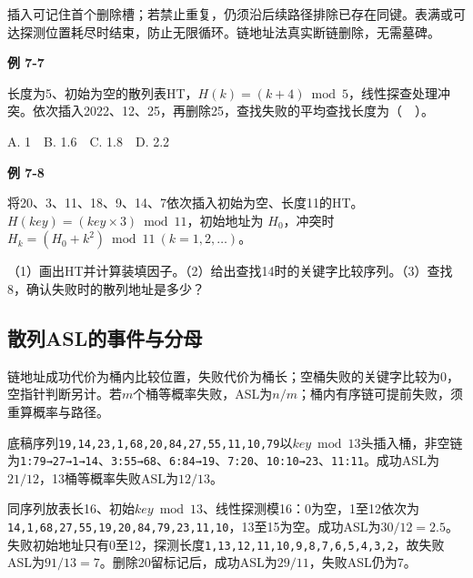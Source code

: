 插入可记住首个删除槽；若禁止重复，仍须沿后续路径排除已存在同键。表满或可达探测位置耗尽时结束，防止无限循环。链地址法真实断链删除，无需墓碑。

\par\medskip{}\noindent\hypertarget{DS07-E07}{}\label{DS07-E07}\textbf{例 7-7}\par\nobreak\smallskip

长度为5、初始为空的散列表HT，\(H(k)=(k+4)\bmod5\)，线性探查处理冲突。依次插入2022、12、25，再删除25，查找失败的平均查找长度为（　）。

A. 1　B. 1.6　C. 1.8　D. 2.2

\par\medskip{}\noindent\hypertarget{DS07-E08}{}\label{DS07-E08}\textbf{例 7-8}\par\nobreak\smallskip

将20、3、11、18、9、14、7依次插入初始为空、长度11的HT。\(H(key)=(key\times3)\bmod11\)，初始地址为 \(H_0\)，冲突时 \(H_k=(H_0+k^2)\bmod11\ (k=1,2,\ldots)\)。

（1）画出HT并计算装填因子。（2）给出查找14时的关键字比较序列。（3）查找8，确认失败时的散列地址是多少？

\subsection{散列ASL的事件与分母}\label{DS07-hash-asl}

链地址成功代价为桶内比较位置，失败代价为桶长；空桶失败的关键字比较为0，空指针判断另计。若\(m\)个桶等概率失败，ASL为\(n/m\)；桶内有序链可提前失败，须重算概率与路径。

底稿序列\texttt{19,\allowbreak{}14,\allowbreak{}23,\allowbreak{}1,\allowbreak{}68,\allowbreak{}20,\allowbreak{}84,\allowbreak{}27,\allowbreak{}55,\allowbreak{}11,\allowbreak{}10,\allowbreak{}79}以\(key\bmod13\)头插入桶，非空链为\texttt{1:\allowbreak{}79→27→1→14}、\texttt{3:\allowbreak{}55→68}、\texttt{6:\allowbreak{}84→19}、\texttt{7:\allowbreak{}20}、\texttt{10:\allowbreak{}10→23}、\texttt{11:\allowbreak{}11}。成功ASL为\(21/12\)，13桶等概率失败ASL为\(12/13\)。

同序列放表长16、初始\(key\bmod13\)、线性探测模16：0为空，1至12依次为\texttt{14,\allowbreak{}1,\allowbreak{}68,\allowbreak{}27,\allowbreak{}55,\allowbreak{}19,\allowbreak{}20,\allowbreak{}84,\allowbreak{}79,\allowbreak{}23,\allowbreak{}11,\allowbreak{}10}，13至15为空。成功ASL为\(30/12=2.5\)。失败初始地址只有0至12，探测长度\texttt{1,\allowbreak{}13,\allowbreak{}12,\allowbreak{}11,\allowbreak{}10,\allowbreak{}9,\allowbreak{}8,\allowbreak{}7,\allowbreak{}6,\allowbreak{}5,\allowbreak{}4,\allowbreak{}3,\allowbreak{}2}，故失败ASL为\(91/13=7\)。删除20留标记后，成功ASL为\(29/11\)，失败ASL仍为7。


